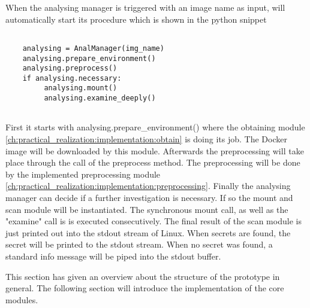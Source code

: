 When the analysing manager is triggered with an image name as input, will automatically start its procedure which is shown in the python snippet
\lstset{language=Python}          %
\begin{lstlisting}[]  % Start your code-block
	
    analysing = AnalManager(img_name)
    analysing.prepare_environment()
    analysing.preprocess()
    if analysing.necessary:
         analysing.mount()
         analysing.examine_deeply()
    
\end{lstlisting}
First it starts with analysing.prepare\_environment() where the obtaining module \ref{ch:practical_realization:implementation:obtain} is doing its job. The Docker image will be downloaded by this module. Afterwards the preprocessing will take place through the call of the preprocess method. The preprocessing will be done by the implemented preprocessing module \ref{ch:practical_realization:implementation:preprocessing}.
Finally the analysing manager can decide if a further investigation is necessary. If so the mount and scan module will be instantiated. The synchronous mount call, as well as the "examine" call is is executed consecutively. The final result of the scan module is just printed out into the stdout stream of Linux.
When secrets are found, the secret will be printed to the stdout stream. When no secret was found, a standard info message will be piped into the stdout buffer.

This section has given an overview about the structure of the prototype in general. The following section will introduce the implementation of the core modules.


